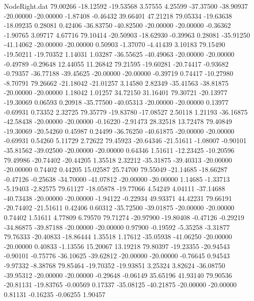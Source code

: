 \begin{filecontents}{NodeRight.dat}
  79.00266  -18.12592  -19.53568     3.57555    4.25599  -37.37500  -38.90937  -20.00000  -20.00000   -1.87408   -0.46432   39.66401   47.21218
  79.05334  -19.63638  -18.09235     0.28081    0.42406  -36.83750  -40.82500  -20.00000  -20.00000   -0.36362   -1.90765    3.09717    4.67716
  79.10414  -20.50903  -18.62930    -0.39963    0.28081  -35.91250  -41.14062  -20.00000  -20.00000    0.50903   -1.37070   -4.41439    3.10183
  79.15490  -19.50211  -19.70352     1.14031    1.03287  -36.55625  -40.49063  -20.00000  -20.00000   -0.49789   -0.29648   12.44055   11.26842
  79.21595  -19.60281  -20.74417    -0.93682   -0.79357  -36.77188  -39.45625  -20.00000  -20.00000   -0.39719    0.74417  -10.27980   -8.70791
  79.26662  -21.18042  -21.01257     3.14580    2.82349  -35.41563  -38.81875  -20.00000  -20.00000    1.18042    1.01257   34.72150   31.16401
  79.30721  -20.13977  -19.30069     0.06593    0.20918  -35.77500  -40.05313  -20.00000  -20.00000    0.13977   -0.69931    0.73352    2.32725
  79.35779  -19.83780  -17.08527     2.50118    1.21193  -36.16875  -42.58438  -20.00000  -20.00000   -0.16220   -2.91473   28.32518   13.72478
  79.40849  -19.30069  -20.54260     0.45987    0.24499  -36.76250  -40.61875  -20.00000  -20.00000   -0.69931    0.54260    5.11729    2.72622
  79.45923  -20.64346  -21.51611    -1.08007   -0.90101  -35.81562  -39.02500  -20.00000  -20.00000    0.64346    1.51611  -12.23425  -10.20596
  79.49986  -20.74402  -20.44205     1.35518    2.32212  -35.31875  -39.40313  -20.00000  -20.00000    0.74402    0.44205   15.02587   25.74700
  79.55049  -21.14685  -18.66287    -0.47126   -0.25638  -34.70000  -41.07812  -20.00000  -20.00000    1.14685   -1.33713   -5.19403   -2.82575
  79.61127  -18.05878  -19.77066     4.54249    4.04111  -37.14688  -40.73438  -20.00000  -20.00000   -1.94122   -0.22934   49.93371   44.42231
  79.66191  -20.74402  -21.51611     0.42406    0.60312  -35.72500  -39.01875  -20.00000  -20.00000    0.74402    1.51611    4.77809    6.79570
  79.71274  -20.97900  -19.80408    -0.47126   -0.29219  -34.86875  -39.87188  -20.00000  -20.00000    0.97900   -0.19592   -5.35258   -3.31877
  79.76333  -20.40833  -18.86444     1.35518    1.17612  -35.05938  -41.06250  -20.00000  -20.00000    0.40833   -1.13556   15.20067   13.19218
  79.80397  -19.23355  -20.94543    -0.90101   -0.75776  -36.10625  -39.62812  -20.00000  -20.00000   -0.76645    0.94543   -9.97332   -8.38768
  79.85464  -19.70352  -19.93851     3.25324    3.82624  -36.08750  -39.95312  -20.00000  -20.00000   -0.29648   -0.06149   35.65196   41.93140
  79.90536  -20.81131  -19.83765    -0.00569    0.17337  -35.08125  -40.21875  -20.00000  -20.00000    0.81131   -0.16235   -0.06255    1.90457

\end{filecontents}
